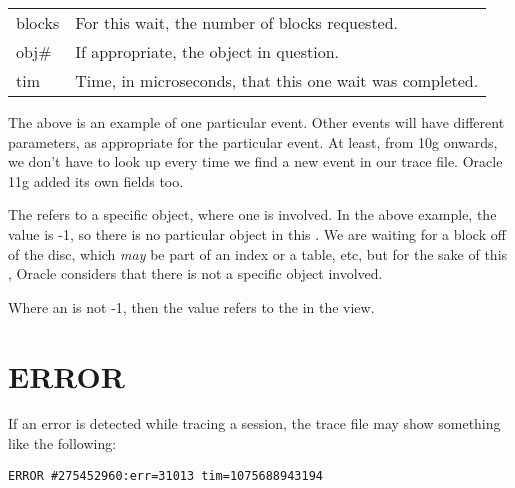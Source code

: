 \begin{longtable}[]{@{}l|l@{}}
\begin{minipage}[t]{0.14\columnwidth}
blocks\strut
\end{minipage} & \begin{minipage}[t]{0.65\columnwidth}\raggedright\strut
For this wait, the number of blocks requested.\strut
\end{minipage}\tabularnewline
\begin{minipage}[t]{0.14\columnwidth}\raggedright\strut
obj\#\strut
\end{minipage} & \begin{minipage}[t]{0.65\columnwidth}\raggedright\strut
If appropriate, the object in question.\strut
\end{minipage}\tabularnewline
\begin{minipage}[t]{0.14\columnwidth}\raggedright\strut
tim\strut
\end{minipage} & \begin{minipage}[t]{0.65\columnwidth}\raggedright\strut
Time, in microseconds, that this one wait was completed.\strut
\end{minipage}\tabularnewline
\bottomrule
\end{longtable}

\begin{note}
The above is an example of one particular  event. Other events will have different parameters, as appropriate for the particular event. At least, from 10g onwards, we don't have to look up  every time we find a new event in our trace file. Oracle 11g added its own fields too.
\end{note}

The  refers to a specific object, where one is involved. In the above example, the value is -1, so there is no particular object in this . We are waiting for a block off of the disc, which \emph{may} be part of an index or a table, etc, but for the sake of this , Oracle considers that there is not a specific object involved.

Where an  is not -1, then the value refers to the  in the  view.

\newpage\section{ERROR}\label{error}

If an error is detected while tracing a session, the trace file may show something like the following:

\begin{lstlisting}[numbers=none,caption={Error Line}]
ERROR #275452960:err=31013 tim=1075688943194
\end{lstlisting}

